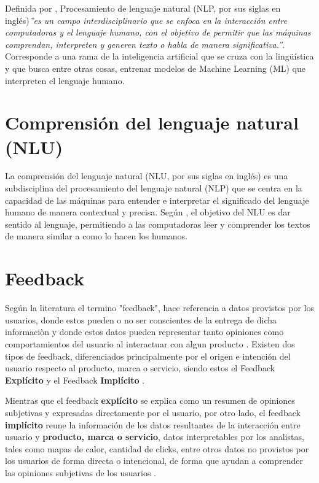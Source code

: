 Definida por \parencite{Khurana_2022},  Procesamiento de lenguaje natural (NLP, por sus siglas en inglés)\textit{''es un campo interdisciplinario que se enfoca en la interacción entre computadoras y el lenguaje humano, con el objetivo de permitir que las máquinas comprendan, interpreten y generen texto o habla de manera significativa.''}. Corresponde a una rama de la inteligencia artificial que se cruza con la lingüística y que busca entre otras cosas, entrenar modelos de Machine Learning (ML) que interpreten el lenguaje humano. 



\section{Comprensión del lenguaje natural (NLU)}
\label{sec:nlu}

La comprensión del lenguaje natural (NLU, por sus siglas en inglés) es una subdisciplina del procesamiento del lenguaje natural (NLP) que se centra en la capacidad de las máquinas para entender e interpretar el significado del lenguaje humano de manera contextual y precisa. Según \parencite{navigli2018natural}, el objetivo del NLU es dar sentido al lenguaje, permitiendo a las computadoras leer y comprender los textos de manera similar a como lo hacen los humanos.


\section{Feedback}
\label{sec:feedback}
Según la literatura el termino "feedback", hace referencia a datos provistos por los usuarios, donde estos pueden o no ser conscientes de la entrega de dicha informaciòn y donde estos datos pueden representar tanto opiniones como comportamientos del usuario al interactuar con algun producto \parencite{tkalich2025user}. Existen dos tipos de feedback, diferenciados principalmente por el origen e intención del usuario respecto al producto, marca o servicio, siendo estos el Feedback \textbf{Explícito} y el Feedback \textbf{Implícito} \parencite{maalej2016data,Fabijan-Customer_Feedback_and_Data_Collection}.

Mientras que el feedback \textbf{explícito} se explica como un resumen de opiniones subjetivas y expresadas directamente por el usuario, por otro lado, el feedback \textbf{implícito} reune la información de los datos resultantes de la interacción entre usuario y \textbf{producto, marca o servicio}, datos interpretables por los analistas, tales como mapas de calor, cantidad de clicks, entre otros datos no provistos por los usuarios de forma directa o intencional, de forma que ayudan a comprender las opiniones subjetivas de los usuarios \cite{maalej2016data}.

